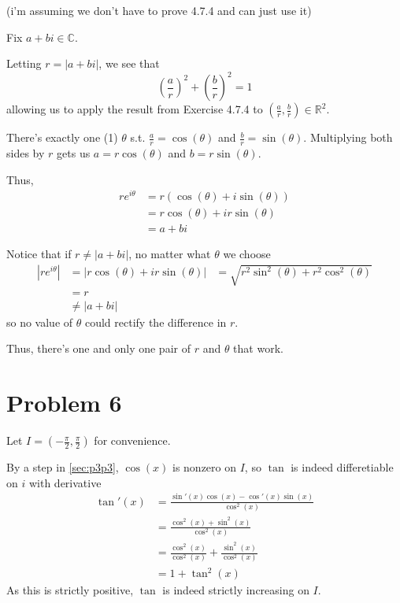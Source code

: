 \documentclass[12pt]{article}
\newcommand{\R}{\mathbb{R}}
\newcommand{\C}{\mathbb{C}}
\begin{document}
 (i'm assuming we don't have to prove 4.7.4 and can just use it)

Fix $a+bi \in \C$.

Letting $r=|a+bi|$, we see that
\[\left(\frac{a}{r}\right)^2+\left(\frac{b}{r}\right)^2=1\]
allowing us to apply the result from Exercise 4.7.4 to $\left(\frac{a}{r}, \frac{b}{r}\right) \in \R^2$.

There's exactly one (1) $\theta$ s.t. $\frac{a}{r}=\cos(\theta)$ and $\frac{b}{r}=\sin(\theta)$.
Multiplying both sides by $r$ gets us $a=r\cos(\theta)$ and $b=r\sin(\theta)$.

Thus,
\begin{align*}
  re^{i\theta}
   & = r(\cos(\theta)+i\sin(\theta)) \\
   & = r\cos(\theta)+ir\sin(\theta)  \\
   & = a+bi
\end{align*}

Notice that if $r \ne |a+bi|$, no matter what $\theta$ we choose
\begin{align*}
  \left|re^{i\theta}\right|
   & = \left|r\cos(\theta)+ir\sin(\theta)\right|
   & = \sqrt{r^2\sin^2(\theta)+r^2\cos^2(\theta)} \\
   & = r                                          \\
   & \ne |a+bi|
\end{align*}
so no value of $\theta$ could rectify the difference in $r$.

Thus, there's one and only one pair of $r$ and $\theta$ that work.

\pagebreak

\section{Problem 6}

Let $I=\left(-\frac{\pi}{2}, \frac{\pi}{2}\right)$ for convenience.

By a step in \ref{sec:p3p3}, $\cos(x)$ is nonzero on $I$, so
$\tan$ is indeed differetiable on $i$ with derivative
\begin{align*}
  \tan'(x)
   & = \frac{\sin'(x)\cos(x)-\cos'(x)\sin(x)}{\cos^2(x)}       \\
   & = \frac{\cos^2(x)+\sin^2(x)}{\cos^2(x)}                   \\
   & = \frac{\cos^2(x)}{\cos^2(x)}+\frac{\sin^2(x)}{\cos^2(x)} \\
   & = 1+\tan^2(x)
\end{align*}
As this is strictly positive, $\tan$ is indeed strictly increasing on $I$.
\end{document}
